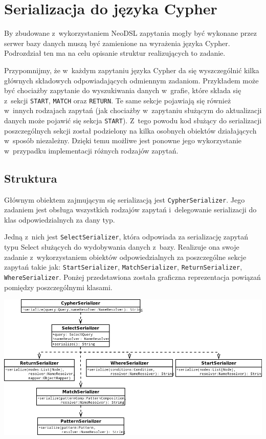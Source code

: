 \documentclass[brudnopis]{xmgr}
\begin{document}
\section{Serializacja do języka Cypher}

By zbudowane z~wykorzystaniem NeoDSL zapytania mogły być wykonane przez serwer bazy danych muszą być zamienione na wyrażenia języka Cypher. Podrozdział ten ma na celu opisanie struktur realizujących to zadanie. 

Przypomnijmy, że w~każdym zapytaniu języka Cypher da się wyszczególnić kilka głównych składowych odpowiadających odmiennym zadaniom. Przykładem może być chociażby zapytanie do wyszukiwania danych w~grafie, które składa się z~sekcji \texttt{START}, \texttt{MATCH} oraz \texttt{RETURN}. Te same sekcje pojawiają się również w~innych rodzajach zapytań (jak chociażby w~zapytaniu służącym do aktualizacji danych może pojawić się sekcja \texttt{START}). Z~tego powodu kod służący do serializacji poszczególnych sekcji został podzielony na kilka osobnych obiektów działających w~sposób niezależny. Dzięki temu możliwe jest ponowne jego wykorzystanie w~przypadku implementacji różnych rodzajów zapytań.

\subsection{Struktura}

Głównym obiektem zajmującym się serializacją jest \texttt{CypherSerializer}. Jego zadaniem jest obsługa wszystkich rodzajów zapytań i~delegowanie serializacji do klas odpowiedzialnych za dany typ.

Jedną z~nich jest \texttt{SelectSerializer}, która odpowiada za serializację zapytań typu Select służących do wydobywania danych z~bazy. Realizuje ona swoje zadanie z~wykorzystaniem obiektów odpowiedzialnych za poszczególne sekcje zapytań takie jak: \texttt{StartSerializer}, \texttt{MatchSerializer}, \texttt{ReturnSerializer}, \texttt{WhereSerializer}. Ponżej przedstawiona została graficzna reprezentacja powiązań pomiędzy poszczególnymi klasami.

\includegraphics[scale=0.5]{images/cypher-serialization-uml.png}
\end{document}
